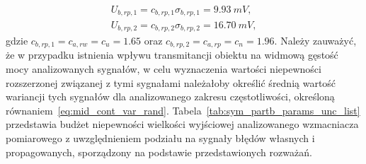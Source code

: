 \begin{gather}
U_{b,rp,1} = c_{b,rp,1} \sigma_{b,rp,1} = \qty{9.93}{mV} \label{eq:sym_partb_uncert_rand_prop_1}, \\
U_{b,rp,2} = c_{b,rp,2} \sigma_{b,rp,2} = \qty{16.70}{mV} \label{eq:sym_partb_uncert_rand_prop_2},
\end{gather}
gdzie $c_{b,rp,1} = c_{a,rw} = c_{u} = \num{1.65}$ oraz $c_{b,rp,2} = c_{a,rp} = c_{n} = \num{1.96}$. Należy zauważyć, że w przypadku istnienia wpływu transmitancji obiektu na widmową gęstość mocy analizowanych sygnałów, w celu wyznaczenia wartości niepewności rozszerzonej związanej z tymi sygnałami należałoby określić średnią wartość wariancji tych sygnałów dla analizowanego zakresu częstotliwości, określoną równaniem~\eqref{eq:mid_cont_var_rand}. Tabela~\ref{tab:sym_partb_params_unc_list} przedstawia budżet niepewności wielkości wyjściowej analizowanego wzmacniacza pomiarowego z uwzględnieniem podziału na sygnały błędów własnych i propagowanych, sporządzony na podstawie przedstawionych rozważań.

